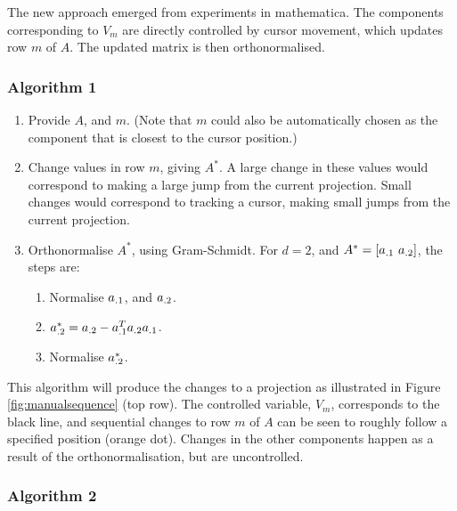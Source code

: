 \documentclass[]{interact}
\theoremstyle{plain}%
\theoremstyle{definition}
\theoremstyle{remark}
\providecommand{\tightlist}{%
  \setlength{\itemsep}{0pt}\setlength{\parskip}{0pt}}
\def\tightlist{}
\begin{document}
The new approach emerged from experiments in mathematica. The components
corresponding to \(V_m\) are directly controlled by cursor movement,
which updates row \(m\) of \(A\). The updated matrix is then
orthonormalised.

\hypertarget{algorithm-1}{%
\subsubsection{Algorithm 1}\label{algorithm-1}}

\begin{enumerate}
\def\labelenumi{\arabic{enumi}.}
\item
  Provide \(A\), and \(m\). (Note that \(m\) could also be automatically
  chosen as the component that is closest to the cursor position.)
\item
  Change values in row \(m\), giving \(A^*\). A large change in these
  values would correspond to making a large jump from the current
  projection. Small changes would correspond to tracking a cursor,
  making small jumps from the current projection.
\item
  Orthonormalise \(A^*\), using Gram-Schmidt. For \(d=2\), and
  \(A^* = \left[ {\boldmath a}_{.1}~{\boldmath a}_{.2}\right]\), the
  steps are:

  \begin{enumerate}
  \def\labelenumii{\roman{enumii}.}
  \tightlist
  \item
    Normalise \({\boldmath a}_{.1}\), and \({\boldmath a}_{.2}\).
  \item
    \({\boldmath a}^*_{.2} = {\boldmath a}_{.2} - {\boldmath a}_{.1}^T{\boldmath a}_{.2}{\boldmath a}_{.1}\).
  \item
    Normalise \({\boldmath a}^*_{.2}\).
  \end{enumerate}
\end{enumerate}

This algorithm will produce the changes to a projection as illustrated
in Figure \ref{fig:manualsequence} (top row). The controlled variable,
\(V_m\), corresponds to the black line, and sequential changes to row
\(m\) of \(A\) can be seen to roughly follow a specified position
(orange dot). Changes in the other components happen as a result of the
orthonormalisation, but are uncontrolled.

\hypertarget{algorithm-2}{%
\subsubsection{Algorithm 2}\label{algorithm-2}}
\end{document}

